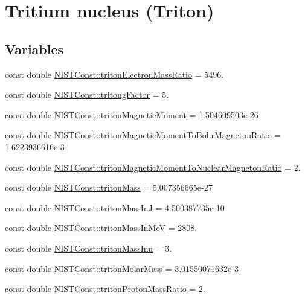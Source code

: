 \hypertarget{group___triton}{}\section{Tritium nucleus (Triton)}
\label{group___triton}
\subsection*{Variables}
\begin{DoxyCompactItemize}
\item 
const double \hyperlink{group___triton_ga8508adabd4d9f81969eeed5838a61443}{N\+I\+S\+T\+Const\+::triton\+Electron\+Mass\+Ratio} = 5496.
\item 
const double \hyperlink{group___triton_ga4d9812975c185048a8367d9838b53215}{N\+I\+S\+T\+Const\+::tritong\+Factor} = 5.
\item 
const double \hyperlink{group___triton_ga9b4063b3a2a14f1ad4718d844f37652e}{N\+I\+S\+T\+Const\+::triton\+Magnetic\+Moment} = 1.\+504609503e-\/26
\item 
const double \hyperlink{group___triton_gaab82c511ed065cbe7b02fd089921cab8}{N\+I\+S\+T\+Const\+::triton\+Magnetic\+Moment\+To\+Bohr\+Magneton\+Ratio} = 1.\+6223936616e-\/3
\item 
const double \hyperlink{group___triton_ga8d3bbca7115a62873fc804963498fad9}{N\+I\+S\+T\+Const\+::triton\+Magnetic\+Moment\+To\+Nuclear\+Magneton\+Ratio} = 2.
\item 
const double \hyperlink{group___triton_ga78c58207fecfdd47e76ce929d9698f0a}{N\+I\+S\+T\+Const\+::triton\+Mass} = 5.\+007356665e-\/27
\item 
const double \hyperlink{group___triton_gac360daadbd387a41c4b4567c90ed6756}{N\+I\+S\+T\+Const\+::triton\+Mass\+InJ} = 4.\+500387735e-\/10
\item 
const double \hyperlink{group___triton_ga71e5de0966b5f8766fe67c6f114c465a}{N\+I\+S\+T\+Const\+::triton\+Mass\+In\+MeV} = 2808.
\item 
const double \hyperlink{group___triton_gad1ea3191cc1092390e96267e7e2e97b3}{N\+I\+S\+T\+Const\+::triton\+Mass\+Inu} = 3.
\item 
const double \hyperlink{group___triton_gab22c798216b8f6290211f61270b77eb9}{N\+I\+S\+T\+Const\+::triton\+Molar\+Mass} = 3.\+01550071632e-\/3
\item 
const double \hyperlink{group___triton_ga955fba44514fff409bec435aadc11f40}{N\+I\+S\+T\+Const\+::triton\+Proton\+Mass\+Ratio} = 2.
\end{DoxyCompactItemize}


